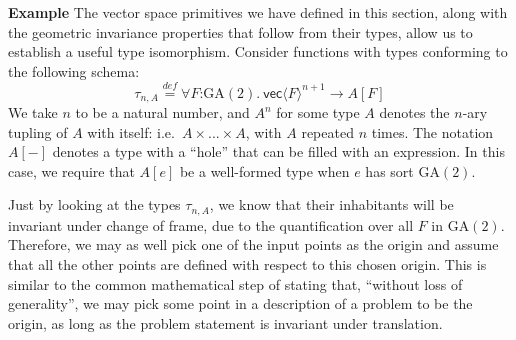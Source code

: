 \documentclass{article}
\newcommand{\GA}{\mathrm{GA}}
\newcommand{\isDefinedAs}{\stackrel{\mathit{def}}=}
\newenvironment{example}{\vspace{0.1in}\noindent\textbf{Example}\quad}{}
\begin{document}
\begin{example}
  The vector space primitives we have defined in this section, along
  with the geometric invariance properties that follow from their
  types, allow us to establish a useful type isomorphism. Consider
  functions with types conforming to the following schema:
  \begin{displaymath}
    \tau_{n,A} \isDefinedAs \forall F\mathord:\GA(2).\ \mathsf{vec}\langle F \rangle^{n+1} \to A[F]
  \end{displaymath}
  We take $n$ to be a natural number, and $A^n$ for some type $A$
  denotes the $n$-ary tupling of $A$ with itself: i.e.~$A \times
  ... \times A$, with $A$ repeated $n$ times. The notation $A[-]$
  denotes a type with a ``hole'' that can be filled with an
  expression. In this case, we require that $A[e]$ be a well-formed
  type when $e$ has sort $\GA(2)$.

  Just by looking at the types $\tau_{n,A}$, we know that their
  inhabitants will be invariant under change of frame, due to the
  quantification over all $F$ in $\GA(2)$. Therefore, we may as well
  pick one of the input points as the origin and assume that all the
  other points are defined with respect to this chosen origin. This is
  similar to the common mathematical step of stating that, ``without
  loss of generality'', we may pick some point in a description of a
  problem to be the origin, as long as the problem statement is
  invariant under translation.


\end{example}
\end{document}
